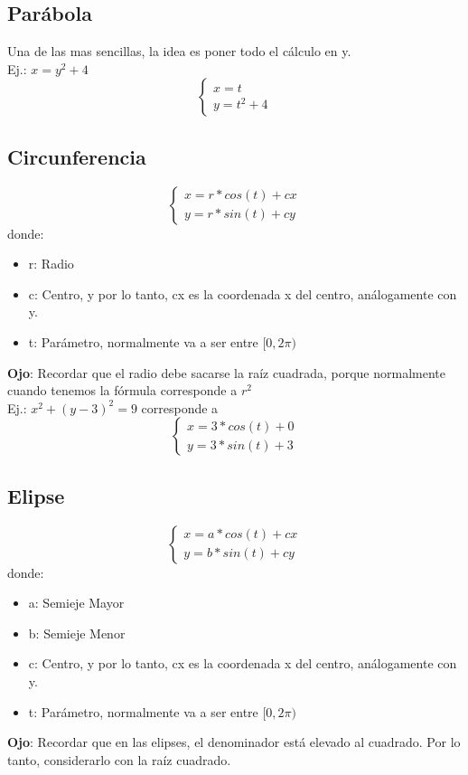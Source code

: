 \documentclass[10pt,a4paper]{article}
\begin{document}
\subsection*{Parábola}
Una de las mas sencillas, la idea es poner todo el cálculo en y. \\
Ej.: $x = y^{2} + 4$
\[
\begin{cases} 
x = t \\
y = t^{2} + 4
\end{cases}
\]
\subsection*{Circunferencia}
\[
\begin{cases} 
x = r * cos(t) + cx \\
y = r * sin(t) + cy
\end{cases}
\]
donde: 
\begin{itemize}
    \item r: Radio
    \item c: Centro, y por lo tanto, cx es la coordenada x del centro, análogamente con y.
    \item t: Parámetro, normalmente va a ser entre $[0, 2\pi)$
\end{itemize}
\textbf{Ojo}: Recordar que el radio debe sacarse la raíz cuadrada, porque normalmente cuando tenemos la fórmula corresponde a $r^{2}$ \\
Ej.: $x^{2} + (y-3)^{2} = 9$ corresponde a 
\[
\begin{cases} 
x = 3 * cos(t) + 0 \\
y = 3 * sin(t) + 3
\end{cases}
\]
\subsection*{Elipse}
\[
\begin{cases} 
x = a * cos(t) + cx \\
y = b * sin(t) + cy
\end{cases}
\]
donde: 
\begin{itemize}
    \item a: Semieje Mayor 
    \item b: Semieje Menor 
    \item c: Centro, y por lo tanto, cx es la coordenada x del centro, análogamente con y.
    \item t: Parámetro, normalmente va a ser entre $[0, 2\pi)$
\end{itemize}
\textbf{Ojo}: Recordar que en las elipses, el denominador está elevado al cuadrado. Por lo tanto, considerarlo con la raíz cuadrado.
\end{document}
